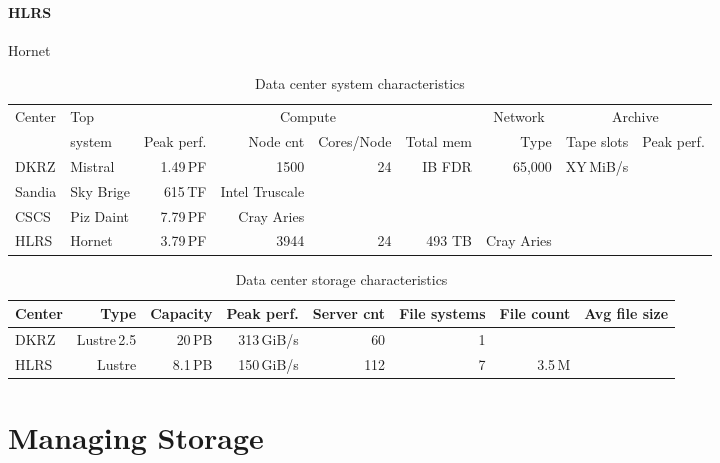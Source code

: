 \documentclass{superfri}
\numberwithin{equation}{section}
\begin{document}
\paragraph{HLRS}
Hornet



\begin{table}[bt]
\renewcommand{\arraystretch}{0.8}
\renewcommand{\tabcolsep}{0.1cm}
\begin{tabular}[c]{ll|r|r|r|r||r||r|r}
Center & Top    & \multicolumn{4}{c||}{Compute}      & \multicolumn{1}{c||}{Network}               & \multicolumn{2}{c}{Archive} \\
 & system & Peak perf. & Node cnt & Cores/Node & Total mem & Type                 & Tape slots & Peak perf. \\ \hline
 \hline

DKRZ & Mistral & 1.49\,PF   & 1500       & 24         & IB FDR                     & 65,000 & XY\,MiB/s \\ \hline
Sandia & Sky Brige & 615\,TF   & Intel Truscale \\ \hline
CSCS & Piz Daint & 7.79\,PF & Cray Aries \\ \hline
HLRS & Hornet & 3.79\,PF & 3944 & 24 & 493 TB & Cray Aries &   \\ \hline

\end{tabular}
\caption{Data center system characteristics\label{tbl:overviewCharacteristics}}
\end{table}

\begin{table}[bt]
\renewcommand{\arraystretch}{0.8}
\renewcommand{\tabcolsep}{0.1cm}
\begin{tabular}[c]{l|r|r|r|r|r|r|r}
Center & Type        & Capacity  & Peak perf.     & Server cnt & File systems & File count    & Avg file size    \\ \hline
DKRZ   & Lustre\,2.5 & 20\,PB    & 313\,GiB/s     & 60         & 1            &               &                  \\ \hline
HLRS   & Lustre  & 8.1\,PB       & 150\,GiB/s     & 112        & 7            & 3.5\,M        & 

\end{tabular}
\caption{Data center storage characteristics\label{tbl:overviewIO}}
\end{table}

\section{Managing Storage}
\end{document}
